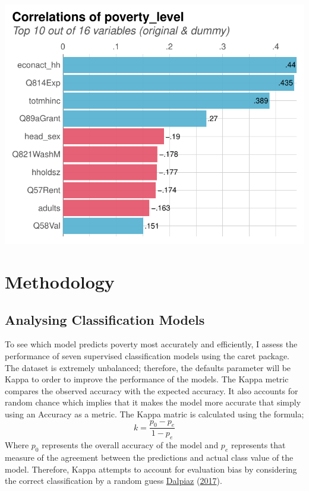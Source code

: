 \documentclass[11pt,preprint, authoryear]{elsarticle}
\let\origfigure\figure
\let\endorigfigure\endfigure
\renewenvironment{figure}[1][2] {
    \expandafter\origfigure\expandafter[H]
} {
    \endorigfigure
}
\numberwithin{equation}{section}
\numberwithin{figure}{section}
\numberwithin{table}{section}
\begin{document}
\begin{figure}[H]

{\centering \includegraphics{Predicting-Poverty_files/figure-latex/Figure4-1} 

}

\caption{Correlation with dependent variable \label{Figure4}}\label{fig:Figure4}
\end{figure}

\hypertarget{methodology}{%
\section{\texorpdfstring{Methodology
\label{Meth}}{Methodology }}\label{methodology}}

\hypertarget{analysing-classification-models}{%
\subsection{Analysing Classification
Models}\label{analysing-classification-models}}

To see which model predicts poverty most accurately and efficiently, I
assess the performance of seven supervised classification models using
the caret package. The dataset is extremely unbalanced; therefore, the
defaults parameter will be Kappa to order to improve the performance of
the models. The Kappa metric compares the observed accuracy with the
expected accuracy. It also accounts for random chance which implies that
it makes the model more accurate that simply using an Accuracy as a
metric. The Kappa matric is calculated using the formula;
\[k = \frac{p_0 -p_e}{1-p_e}\] Where \(p_0\) represents the overall
accuracy of the model and \(p_e\) represents that measure of the
agreement between the predictions and actual class value of the model.
Therefore, Kappa attempts to account for evaluation bias by considering
the correct classification by a random guess
\protect\hyperlink{ref-dalpiaz}{Dalpiaz}
(\protect\hyperlink{ref-dalpiaz}{2017}).
\end{document}
